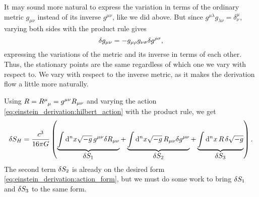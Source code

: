 It may sound more natural to express the variation in terms of the ordinary metric $g_{\mu \nu}$ instead of its inverse $g^{\mu \nu}$, like we did above.
But since $g^{\mu \lambda} g_{\lambda \nu} = \delta^\mu_\nu$, varying both sides with the product rule gives
\begin{equation}
	\delta g_{\mu \nu} = -g_{\mu \rho} g_{\nu \sigma} \delta g^{\rho \sigma} ,
	\label{eq:einstein_derivation:var_g_ginv}
\end{equation}
expressing the variations of the metric and its inverse in terms of each other.
Thus, the stationary points are the same regardless of which one we vary with respect to.
We vary with respect to the inverse metric, as it makes the derivation flow a little more naturally.

Using $R = R\indices{^\mu_\mu} = g^{\mu \nu} R_{\mu \nu}$ and varying the action \eqref{eq:einstein_derivation:hilbert_action} with the product rule, we get
\begin{equation}
	\delta S_H = \frac{c^3}{16 \pi G} \left(
	                  \underbrace{\int \mathop{}\!\mathrm{d}^n x \sqrt{-g} \, g^{\mu \nu} \delta R_{\mu \nu}}_{\textstyle \delta S_1}
	                + \underbrace{\int \mathop{}\!\mathrm{d}^n x \sqrt{-g} \, R_{\mu \nu} \delta g^{\mu \nu}}_{\textstyle \delta S_2}
	                + \underbrace{\int \mathop{}\!\mathrm{d}^n x \, R \, \delta \sqrt{-g}                      }_{\textstyle \delta S_3}
					\right) .
	\label{eq:einstein_derivation:ds_split}
\end{equation}
The second term $\delta S_2$ is already on the desired form \eqref{eq:einstein_derivation:action_form}, but we must do some work to bring $\delta S_1$ and $\delta S_3$ to the same form.

